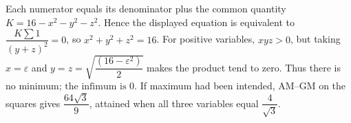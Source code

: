 Each numerator equals its denominator plus the common quantity $K=16-x^2-y^2-z^2$. Hence the displayed equation is equivalent to $\dfrac{K\sum1}{(y+z)^2}=0$, so $x^2+y^2+z^2=16$. For positive variables, $xyz>0$, but taking $x=\varepsilon$ and $y=z=\sqrt{\dfrac{(16-\varepsilon^2)}{2}}$ makes the product tend to zero. Thus there is $\boxed{\text{no minimum; the infimum is }0}$. If maximum had been intended, AM--GM on the squares gives $\dfrac{64\sqrt3}{9}$, attained when all three variables equal $\dfrac{4}{\sqrt3}$.
